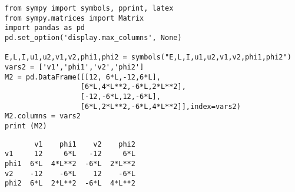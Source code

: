 \documentclass[12pt,fleqn]{article}\usepackage{../../common}
\begin{document}

\begin{verbatim}
from sympy import symbols, pprint, latex
from sympy.matrices import Matrix
import pandas as pd
pd.set_option('display.max_columns', None)

E,L,I,u1,u2,v1,v2,phi1,phi2 = symbols("E,L,I,u1,u2,v1,v2,phi1,phi2")
vars2 = ['v1','phi1','v2','phi2']
M2 = pd.DataFrame([[12, 6*L,-12,6*L],
                  [6*L,4*L**2,-6*L,2*L**2],
                  [-12,-6*L,12,-6*L],
                  [6*L,2*L**2,-6*L,4*L**2]],index=vars2)
M2.columns = vars2
print (M2)
\end{verbatim}

\begin{verbatim}
       v1    phi1    v2    phi2
v1     12     6*L   -12     6*L
phi1  6*L  4*L**2  -6*L  2*L**2
v2    -12    -6*L    12    -6*L
phi2  6*L  2*L**2  -6*L  4*L**2
\end{verbatim}
\end{document}
